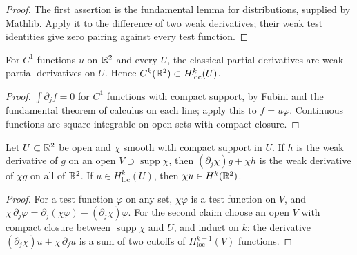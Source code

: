 \begin{proof}
\leanok
The first assertion is the fundamental lemma for distributions, supplied by
Mathlib. Apply it to the difference of two weak derivatives; their weak test
identities give zero pairing against every test function.
\end{proof}

\begin{lemma}
\label{lem:weak-derivative-classical}
\leanok
For $C^1$ functions $u$ on $\mathbb{R}^2$ and every $U$, the classical partial derivatives
are weak partial derivatives on $U$. Hence $C^k(\mathbb{R}^2)\subset H^k_{\mathrm{loc}}(U)$.
\end{lemma}

\begin{proof}
\leanok
$\int\partial_jf=0$ for $C^1$ functions with compact support, by Fubini and the
fundamental theorem of calculus on each line; apply this to $f=u\varphi$.
Continuous functions are square integrable on open sets with compact closure.
\end{proof}

\begin{lemma}
\label{lem:localization-cutoff}
\leanok
Let $U\subset\mathbb{R}^2$ be open and $\chi$ smooth with compact support in $U$. If $h$
is the weak derivative of $g$ on an open $V\supset\operatorname{supp}\chi$, then
$(\partial_j\chi)g+\chi h$ is the weak derivative of $\chi g$ on all of $\mathbb{R}^2$. If
$u\in H^k_{\mathrm{loc}}(U)$, then $\chi u\in H^k(\mathbb{R}^2)$.
\end{lemma}

\begin{proof}
\leanok
For a test function $\varphi$ on any set, $\chi\varphi$ is a test function on $V$,
and $\chi\,\partial_j\varphi=\partial_j(\chi\varphi)-(\partial_j\chi)\varphi$.
For the second claim choose an open $V$ with compact closure between
$\operatorname{supp}\chi$ and $U$, and induct on $k$: the derivative
$(\partial_j\chi)u+\chi\,\partial_ju$ is a sum of two cutoffs of
$H^{k-1}_{\mathrm{loc}}(V)$ functions.
\end{proof}

